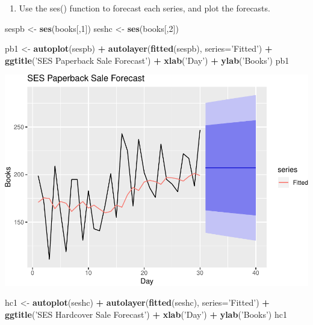 \documentclass[]{article}
\newenvironment{Shaded}{\begin{snugshade}}{\end{snugshade}}
\newcommand{\KeywordTok}[1]{\textcolor[rgb]{0.13,0.29,0.53}{\textbf{#1}}}
\newcommand{\DataTypeTok}[1]{\textcolor[rgb]{0.13,0.29,0.53}{#1}}
\newcommand{\DecValTok}[1]{\textcolor[rgb]{0.00,0.00,0.81}{#1}}
\newcommand{\StringTok}[1]{\textcolor[rgb]{0.31,0.60,0.02}{#1}}
\newcommand{\OperatorTok}[1]{\textcolor[rgb]{0.81,0.36,0.00}{\textbf{#1}}}
\newcommand{\NormalTok}[1]{#1}
\providecommand{\tightlist}{%
  \setlength{\itemsep}{0pt}\setlength{\parskip}{0pt}}
\begin{document}
\begin{enumerate}
\def\labelenumi{\alph{enumi})}
\setcounter{enumi}{1}
\tightlist
\item
  Use the ses() function to forecast each series, and plot the
  forecasts.
\end{enumerate}

\begin{Shaded}
\begin{Highlighting}[]
\NormalTok{sespb <-}\StringTok{ }\KeywordTok{ses}\NormalTok{(books[,}\DecValTok{1}\NormalTok{])}
\NormalTok{seshc <-}\StringTok{ }\KeywordTok{ses}\NormalTok{(books[,}\DecValTok{2}\NormalTok{])}

\NormalTok{pb1 <-}\StringTok{ }\KeywordTok{autoplot}\NormalTok{(sespb) }\OperatorTok{+}
\StringTok{  }\KeywordTok{autolayer}\NormalTok{(}\KeywordTok{fitted}\NormalTok{(sespb), }\DataTypeTok{series=}\StringTok{'Fitted'}\NormalTok{) }\OperatorTok{+}
\StringTok{  }\KeywordTok{ggtitle}\NormalTok{(}\StringTok{'SES Paperback Sale Forecast'}\NormalTok{) }\OperatorTok{+}
\StringTok{  }\KeywordTok{xlab}\NormalTok{(}\StringTok{'Day'}\NormalTok{) }\OperatorTok{+}
\StringTok{  }\KeywordTok{ylab}\NormalTok{(}\StringTok{'Books'}\NormalTok{)}
\NormalTok{pb1}
\end{Highlighting}
\end{Shaded}

\includegraphics{Hw4_files/figure-latex/unnamed-chunk-6-1.pdf}

\begin{Shaded}
\begin{Highlighting}[]
\NormalTok{hc1 <-}\StringTok{ }\KeywordTok{autoplot}\NormalTok{(seshc) }\OperatorTok{+}
\StringTok{  }\KeywordTok{autolayer}\NormalTok{(}\KeywordTok{fitted}\NormalTok{(seshc), }\DataTypeTok{series=}\StringTok{'Fitted'}\NormalTok{) }\OperatorTok{+}
\StringTok{  }\KeywordTok{ggtitle}\NormalTok{(}\StringTok{'SES Hardcover Sale Forecast'}\NormalTok{) }\OperatorTok{+}
\StringTok{  }\KeywordTok{xlab}\NormalTok{(}\StringTok{'Day'}\NormalTok{) }\OperatorTok{+}
\StringTok{  }\KeywordTok{ylab}\NormalTok{(}\StringTok{'Books'}\NormalTok{)}
\NormalTok{hc1}
\end{Highlighting}
\end{Shaded}
\end{document}
